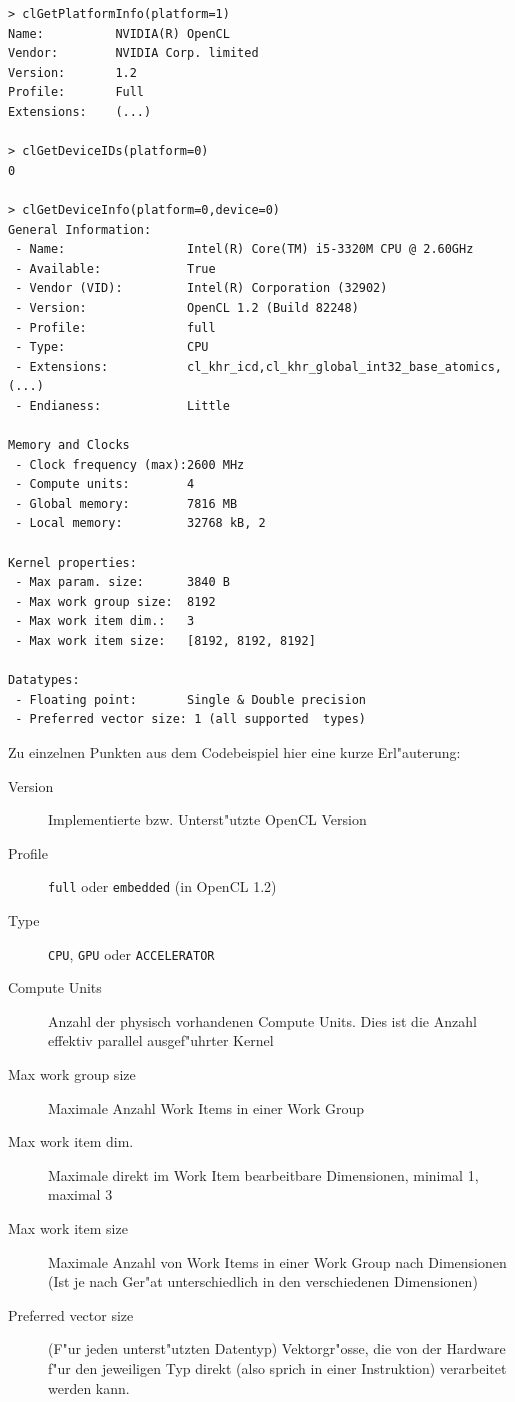 \begin{refsection}
\begin{small}
\begin{verbatim}
> clGetPlatformInfo(platform=1)
Name:          NVIDIA(R) OpenCL
Vendor:        NVIDIA Corp. limited
Version:       1.2
Profile:       Full
Extensions:    (...)

> clGetDeviceIDs(platform=0)
0

> clGetDeviceInfo(platform=0,device=0)
General Information:
 - Name:                 Intel(R) Core(TM) i5-3320M CPU @ 2.60GHz
 - Available:            True
 - Vendor (VID):         Intel(R) Corporation (32902)
 - Version:              OpenCL 1.2 (Build 82248)
 - Profile:              full
 - Type:                 CPU 
 - Extensions:           cl_khr_icd,cl_khr_global_int32_base_atomics,(...)
 - Endianess:            Little

Memory and Clocks
 - Clock frequency (max):2600 MHz
 - Compute units:        4
 - Global memory:        7816 MB
 - Local memory:         32768 kB, 2

Kernel properties:
 - Max param. size:      3840 B
 - Max work group size:  8192
 - Max work item dim.:   3
 - Max work item size:   [8192, 8192, 8192]

Datatypes:
 - Floating point:       Single & Double precision
 - Preferred vector size: 1 (all supported  types)
\end{verbatim}
\end{small}

\vspace{1em}

\noindent Zu einzelnen Punkten aus dem Codebeispiel hier eine kurze Erl"auterung:


\begin{description}
 \item [Version] Implementierte bzw. Unterst"utzte OpenCL Version
 \item [Profile] \texttt{full} oder \texttt{embedded} (in OpenCL 1.2)
 \item [Type]    \texttt{CPU}, \texttt{GPU} oder \texttt{ACCELERATOR}
 \item [Compute Units] Anzahl der physisch vorhandenen Compute Units. Dies ist
                 die Anzahl effektiv parallel ausgef"uhrter Kernel
 \item [Max work group size] Maximale Anzahl Work Items in einer Work Group
 \item [Max work item dim.] Maximale direkt im Work Item bearbeitbare Dimensionen, minimal 1, maximal 3
 \item [Max work item size] Maximale Anzahl von Work Items in einer Work Group nach
                 Dimensionen (Ist je nach Ger"at unterschiedlich in den verschiedenen
                 Dimensionen)
 \item [Preferred vector size] (F"ur jeden unterst"utzten Datentyp) Vektorgr"osse, 
                 die von der Hardware f"ur den jeweiligen Typ direkt (also sprich in einer 
                 Instruktion) verarbeitet werden kann.
 

\end{description}
\end{refsection}
